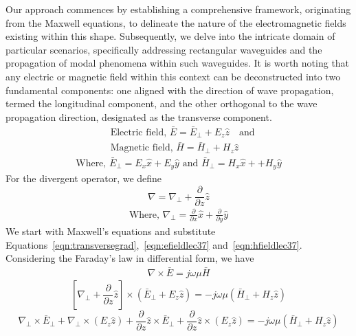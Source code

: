 Our approach commences by establishing a comprehensive framework, originating from the Maxwell equations, to delineate the nature of the electromagnetic fields existing within this shape. Subsequently, we delve into the intricate domain of particular scenarios, specifically addressing rectangular waveguides and the propagation of modal phenomena within such waveguides. It is worth noting that any electric or magnetic field within this context can be deconstructed into two fundamental components: one aligned with the direction of wave propagation, termed the longitudinal component, and the other orthogonal to the wave propagation direction, designated as the transverse component.
\begin{align}
&\text{Electric field, }\bar{E} = \bar{E}_\bot + E_z\hat{z}\quad\text{and}\label{eqn:efieldlec37}\\
&\text{Magnetic field, }\bar{H} = \bar{H}_\bot + H_z\hat{z}\label{eqn:hfieldlec37}
\end{align}
\begin{align*}
\text{Where, }\bar{E}_\bot = E_x\hat{x} + E_y\hat{y}\text{ and }
\bar{H}_\bot = H_x\hat{x} + + H_y\hat{y}
\end{align*}
For the divergent operator, we define
\begin{equation}
\nabla = \nabla_\bot + \frac{\partial}{\partial z}\hat{z}
\label{eqn:transversegrad}
\end{equation}
\begin{align*}
\text{Where, }\nabla_\bot = \frac{\partial}{\partial x}\hat{x} + \frac{\partial}{\partial y}\hat{y}
\end{align*}
We start with Maxwell's equations and substitute Equations~\ref{eqn:transversegrad},~\ref{eqn:efieldlec37} and~\ref{eqn:hfieldlec37}. Considering the Faraday's law in differential form, we have
\begin{align*}
\nabla\times\bar{E} = j\omega\mu\bar{H}
\end{align*}
\begin{dmath*}
\left[\nabla_\bot + \frac{\partial}{\partial z}\hat{z}\right]\times(\bar{E}_\bot + E_z\hat{z}) = -j\omega\mu(\bar{H}_\bot + H_z\hat{z})
\end{dmath*}
\begin{dmath*}
\nabla_\bot\times\bar{E}_\bot + \nabla_\bot\times(E_z\hat{z}) + \frac{\partial}{\partial z}\hat{z}\times\bar{E}_\bot + \frac{\partial}{\partial z}\hat{z}\times(E_z\hat{z}) = -j\omega\mu(\bar{H}_\bot + H_z\hat{z})
\end{dmath*}
